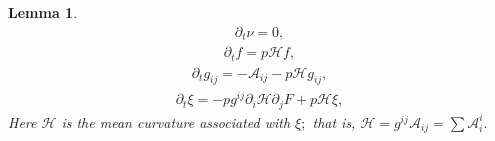 \documentclass{amsart}
\newtheorem{lemma}[theorem]{Lemma}
\theoremstyle{definition}
\theoremstyle{remark}
\numberwithin{equation}{section}
\begin{document}
\begin{lemma}
\begin{align}
\partial_t\nu=0,
\end{align}
\begin{align}
\partial_t f = p  \mathcal{H} f ,
\end{align}
\begin{align}
\partial_tg_{ij}=-\mathcal{A}_{ij}- p  \mathcal{H}g_{ij},
\end{align}
\begin{align}
\partial_t\xi=- p  g^{ij}\partial_i\mathcal{H}\partial_jF+ p  \mathcal{H}\xi,
\end{align}
Here $\mathcal{H}$ is the mean curvature associated with $\xi;$ that is, $\mathcal{H}=g^{ij}\mathcal{A}_{ij}=\sum \mathcal{A}_i^i.$
\end{lemma}
\end{document}

